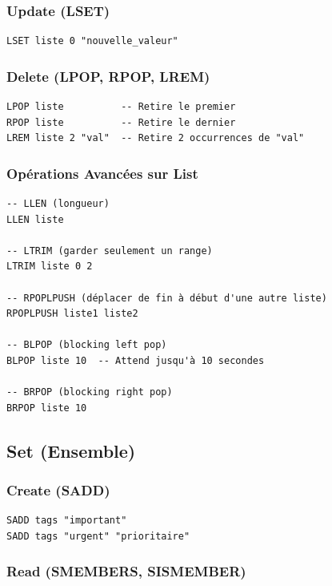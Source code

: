 \documentclass[11pt,a4paper]{article}
\begin{document}
\subsubsection{Update (LSET)}

\begin{lstlisting}
LSET liste 0 "nouvelle_valeur"
\end{lstlisting}

\subsubsection{Delete (LPOP, RPOP, LREM)}

\begin{lstlisting}
LPOP liste          -- Retire le premier
RPOP liste          -- Retire le dernier
LREM liste 2 "val"  -- Retire 2 occurrences de "val"
\end{lstlisting}

\subsubsection{Opérations Avancées sur List}

\begin{lstlisting}
-- LLEN (longueur)
LLEN liste

-- LTRIM (garder seulement un range)
LTRIM liste 0 2

-- RPOPLPUSH (déplacer de fin à début d'une autre liste)
RPOPLPUSH liste1 liste2

-- BLPOP (blocking left pop)
BLPOP liste 10  -- Attend jusqu'à 10 secondes

-- BRPOP (blocking right pop)
BRPOP liste 10
\end{lstlisting}

\subsection{Set (Ensemble)}

\subsubsection{Create (SADD)}

\begin{lstlisting}
SADD tags "important"
SADD tags "urgent" "prioritaire"
\end{lstlisting}

\subsubsection{Read (SMEMBERS, SISMEMBER)}
\end{document}
